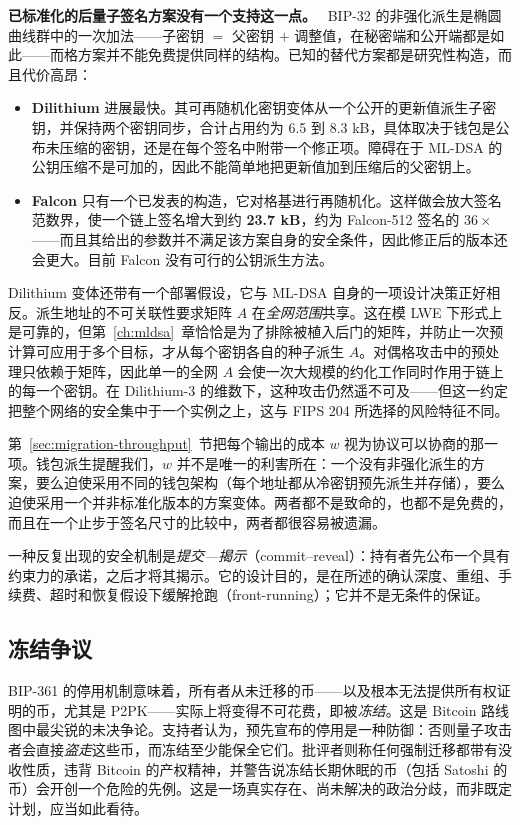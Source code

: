 \textbf{已标准化的后量子签名方案没有一个支持这一点。}~\cite{blockstreamlattice2026} BIP-32 的非强化派生是椭圆曲线群中的一次加法——子密钥 $=$ 父密钥 $+$ 调整值，在秘密端和公开端都是如此——而格方案并不能免费提供同样的结构。已知的替代方案都是研究性构造，而且代价高昂：

\begin{itemize}
  \item \textbf{Dilithium} 进展最快。其可再随机化密钥变体从一个公开的更新值派生子密钥，并保持两个密钥同步，合计占用约为 6.5 到 8.3 kB，具体取决于钱包是公布未压缩的密钥，还是在每个签名中附带一个修正项。障碍在于 ML-DSA 的公钥压缩不是可加的，因此不能简单地把更新值加到压缩后的父密钥上。
  \item \textbf{Falcon} 只有一个已发表的构造，它对格基进行再随机化。这样做会放大签名范数界，使一个链上签名增大到约 \textbf{23.7 kB}，约为 Falcon-512 签名的 $36\times$——而且其给出的参数并不满足该方案自身的安全条件，因此修正后的版本还会更大。目前 Falcon 没有可行的公钥派生方法。
\end{itemize}

Dilithium 变体还带有一个部署假设，它与 ML-DSA 自身的一项设计决策正好相反。派生地址的不可关联性要求矩阵 $A$ 在\emph{全网范围}共享。这在模 LWE 下形式上是可靠的，但第~\ref{ch:mldsa}~章恰恰是为了排除被植入后门的矩阵，并防止一次预计算可应用于多个目标，才从每个密钥各自的种子派生 $A$。对偶格攻击中的预处理只依赖于矩阵，因此单一的全网 $A$ 会使一次大规模的约化工作同时作用于链上的每一个密钥。在 Dilithium-3 的维数下，这种攻击仍然遥不可及——但这一约定把整个网络的安全集中于一个实例之上，这与 FIPS 204 所选择的风险特征不同。

\begin{remark}[这对迁移意味着什么代价]
第~\ref{sec:migration-throughput}~节把每个输出的成本 $w$ 视为协议可以协商的那一项。钱包派生提醒我们，$w$ 并不是唯一的利害所在：一个没有非强化派生的方案，要么迫使采用不同的钱包架构（每个地址都从冷密钥预先派生并存储），要么迫使采用一个并非标准化版本的方案变体。两者都不是致命的，也都不是免费的，而且在一个止步于签名尺寸的比较中，两者都很容易被遗漏。
\end{remark}

一种反复出现的安全机制是\emph{提交—揭示}（commit--reveal）：持有者先公布一个具有约束力的承诺，之后才将其揭示。它的设计目的，是在所述的确认深度、重组、手续费、超时和恢复假设下缓解抢跑（front-running）；它并不是无条件的保证。

\subsection{冻结争议}
\label{sec:freeze}
BIP-361 的停用机制意味着，所有者从未迁移的币——以及根本无法提供所有权证明的币，尤其是 P2PK——实际上将变得不可花费，即被\emph{冻结}。这是 Bitcoin 路线图中最尖锐的未决争论。支持者认为，预先宣布的停用是一种防御：否则量子攻击者会直接\emph{盗走}这些币，而冻结至少能保全它们。批评者则称任何强制迁移都带有没收性质，违背 Bitcoin 的产权精神，并警告说冻结长期休眠的币（包括 Satoshi 的币）会开创一个危险的先例。这是一场真实存在、尚未解决的政治分歧，而非既定计划，应当如此看待。

